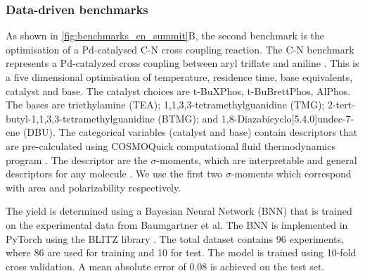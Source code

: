 
 
\subsubsection{Data-driven benchmarks}

As shown in \ref{fig:benchmarks_cn_summit}B, the second benchmark is the optimisation of a Pd-catalysed C-N cross coupling reaction. The C-N benchmark represents a Pd-catalyzed cross coupling between aryl triflate and aniline \cite{Baumgartner2019}. This is a five dimensional optimisation of temperature, residence time, base equivalents, catalyst and base. The catalyst choices are t-BuXPhos, t-BuBrettPhos, AlPhos. The bases are triethylamine (TEA); 1,1,3,3-tetramethylguanidine (TMG); 2-tert-butyl-1,1,3,3-tetramethylguanidine (BTMG); and 1,8-Diazabicyclo[5.4.0]undec-7-ene (DBU). The categorical variables (catalyst and base) contain descriptors that are pre-calculated using COSMOQuick computational fluid thermodynamics program \cite{Loschen2012}. The descriptor are the $\sigma$-moments, which are interpretable and general descriptors for any molecule \cite{Zissimos2002}. We use the first two $\sigma$-moments which correspond with area and polarizability respectively.

The yield is determined using a Bayesian Neural Network (BNN) that is trained on the experimental data from Baumgartner et al.\cite{Baumgartner2019} The BNN is implemented in PyTorch \cite{Paszke2019} using the BLITZ library \cite{Esposito2020}. The total dataset contains 96 experiments, where 86 are used for training and 10 for test. The model is trained using 10-fold cross validation. A mean absolute error of 0.08 is achieved on the test set.


